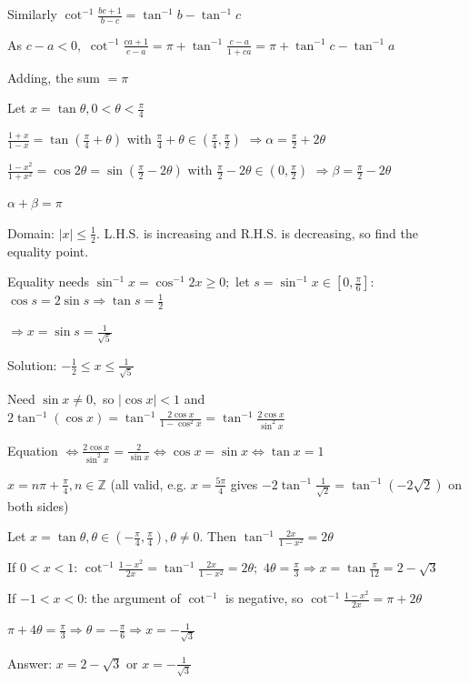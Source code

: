   Similarly $\cot^{-1}\frac{bc + 1}{b - c} = \tan^{-1}b - \tan^{-1}c$

  As $c - a < 0,$ $\cot^{-1}\frac{ca + 1}{c - a} = \pi + \tan^{-1}\frac{c - a}{1 + ca} = \pi + \tan^{-1}c - \tan^{-1}a$

  Adding, the sum $= \pi$

\item Let $x = \tan\theta, 0 < \theta < \frac{\pi}{4}$

  $\frac{1 + x}{1 - x} = \tan\left(\frac{\pi}{4} + \theta\right)$ with $\frac{\pi}{4} + \theta\in\left(\frac{\pi}{4},
  \frac{\pi}{2}\right)$ $\Rightarrow \alpha = \frac{\pi}{2} + 2\theta$

  $\frac{1 - x^2}{1 + x^2} = \cos2\theta = \sin\left(\frac{\pi}{2} - 2\theta\right)$ with $\frac{\pi}{2} - 2\theta\in\left(0,
  \frac{\pi}{2}\right)$ $\Rightarrow \beta = \frac{\pi}{2} - 2\theta$

  $\alpha + \beta = \pi$

\item Domain: $|x|\leq \frac{1}{2}.$ L.H.S. is increasing and R.H.S. is decreasing, so find the equality point.

  Equality needs $\sin^{-1}x = \cos^{-1}2x\geq 0;$ let $s = \sin^{-1}x\in\left[0, \frac{\pi}{6}\right]$: $\cos s = 2\sin s
  \Rightarrow \tan s = \frac{1}{2}$

  $\Rightarrow x = \sin s = \frac{1}{\sqrt{5}}$

  Solution: $-\frac{1}{2}\leq x\leq \frac{1}{\sqrt{5}}$

\item Need $\sin x\neq 0,$ so $|\cos x| < 1$ and $2\tan^{-1}(\cos x) = \tan^{-1}\frac{2\cos x}{1 - \cos^2x} =
  \tan^{-1}\frac{2\cos x}{\sin^2x}$

  Equation $\iff \frac{2\cos x}{\sin^2x} = \frac{2}{\sin x} \iff \cos x = \sin x \iff \tan x = 1$

  $x = n\pi + \frac{\pi}{4}, n\in\mathbb{Z}$ (all valid, e.g. $x = \frac{5\pi}{4}$ gives $-2\tan^{-1}\frac{1}{\sqrt{2}} =
  \tan^{-1}(-2\sqrt{2})$ on both sides)

\item Let $x = \tan\theta, \theta\in\left(-\frac{\pi}{4}, \frac{\pi}{4}\right), \theta\neq 0.$ Then $\tan^{-1}\frac{2x}{1 - x^2} =
  2\theta$

  If $0 < x < 1$: $\cot^{-1}\frac{1 - x^2}{2x} = \tan^{-1}\frac{2x}{1 - x^2} = 2\theta;$ $4\theta = \frac{\pi}{3} \Rightarrow x =
  \tan\frac{\pi}{12} = 2 - \sqrt{3}$

  If $-1 < x < 0$: the argument of $\cot^{-1}$ is negative, so $\cot^{-1}\frac{1 - x^2}{2x} = \pi + 2\theta$

  $\pi + 4\theta = \frac{\pi}{3} \Rightarrow \theta = -\frac{\pi}{6} \Rightarrow x = -\frac{1}{\sqrt{3}}$

  Answer: $x = 2 - \sqrt{3}$ or $x = -\frac{1}{\sqrt{3}}$
\stopitemize
